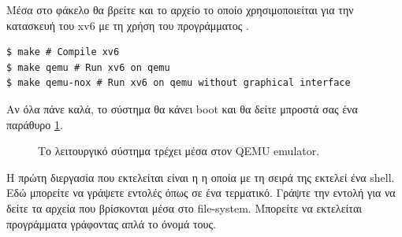 \documentclass[18pt]{extarticle}
\begin{document}
Μέσα στο φάκελο  θα βρείτε και το αρχείο  το οποίο χρησιμοποιείται για την κατασκευή του xv6 με τη χρήση του προγράμματος .

\begin{commandline}
\begin{verbatim}
$ make # Compile xv6
$ make qemu # Run xv6 on qemu
$ make qemu-nox # Run xv6 on qemu without graphical interface
\end{verbatim}
\end{commandline}

Αν όλα πάνε καλά, το σύστημα θα κάνει boot και θα δείτε μπροστά σας ένα παράθυρο \ref{fig:xv6-start}.

\begin{figure}
    \begin{center}
    \end{center}
    \caption{Το λειτουργικό σύστημα τρέχει μέσα στον QEMU emulator.}
    \label{fig:xv6-start}
\end{figure}

Η πρώτη διεργασία που εκτελείται είναι η  η οποία με τη σειρά της εκτελεί ένα shell.
Εδώ μπορείτε να γράψετε εντολές όπως σε ένα τερματικό. Γράψτε την εντολή  για να δείτε 
τα αρχεία που βρίσκονται μέσα στο file-system. Μπορείτε να εκτελείται προγράμματα γράφοντας απλά το όνομά τους. 
\end{document}
